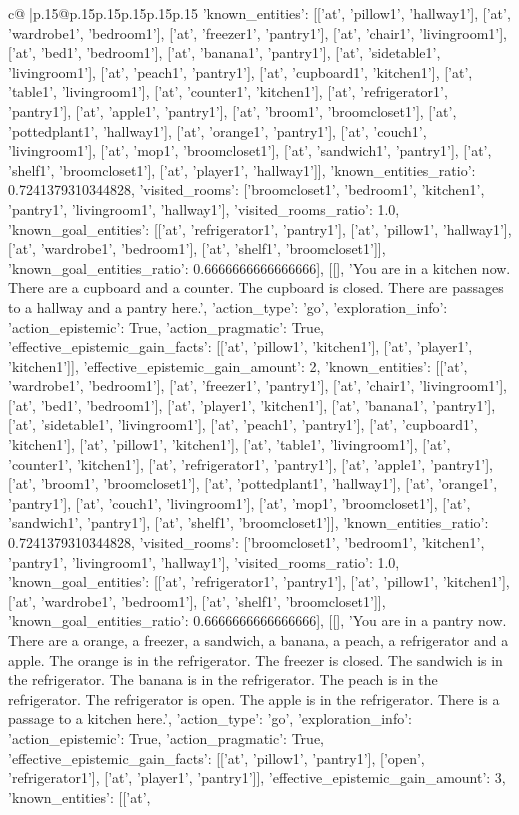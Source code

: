 \documentclass{article}
\begin{document}
{\begin{supertabular}{c@{$\;$}|p{.15\linewidth}@{}p{.15\linewidth}p{.15\linewidth}p{.15\linewidth}p{.15\linewidth}p{.15\linewidth}}
{{{'known_entities': [['at', 'pillow1', 'hallway1'], ['at', 'wardrobe1', 'bedroom1'], ['at', 'freezer1', 'pantry1'], ['at', 'chair1', 'livingroom1'], ['at', 'bed1', 'bedroom1'], ['at', 'banana1', 'pantry1'], ['at', 'sidetable1', 'livingroom1'], ['at', 'peach1', 'pantry1'], ['at', 'cupboard1', 'kitchen1'], ['at', 'table1', 'livingroom1'], ['at', 'counter1', 'kitchen1'], ['at', 'refrigerator1', 'pantry1'], ['at', 'apple1', 'pantry1'], ['at', 'broom1', 'broomcloset1'], ['at', 'pottedplant1', 'hallway1'], ['at', 'orange1', 'pantry1'], ['at', 'couch1', 'livingroom1'], ['at', 'mop1', 'broomcloset1'], ['at', 'sandwich1', 'pantry1'], ['at', 'shelf1', 'broomcloset1'], ['at', 'player1', 'hallway1']], 'known_entities_ratio': 0.7241379310344828, 'visited_rooms': ['broomcloset1', 'bedroom1', 'kitchen1', 'pantry1', 'livingroom1', 'hallway1'], 'visited_rooms_ratio': 1.0, 'known_goal_entities': [['at', 'refrigerator1', 'pantry1'], ['at', 'pillow1', 'hallway1'], ['at', 'wardrobe1', 'bedroom1'], ['at', 'shelf1', 'broomcloset1']], 'known_goal_entities_ratio': 0.6666666666666666}}], [[], 'You are in a kitchen now. There are a cupboard and a counter. The cupboard is closed. There are passages to a hallway and a pantry here.', {'action_type': 'go', 'exploration_info': {'action_epistemic': True, 'action_pragmatic': True, 'effective_epistemic_gain_facts': [['at', 'pillow1', 'kitchen1'], ['at', 'player1', 'kitchen1']], 'effective_epistemic_gain_amount': 2, 'known_entities': [['at', 'wardrobe1', 'bedroom1'], ['at', 'freezer1', 'pantry1'], ['at', 'chair1', 'livingroom1'], ['at', 'bed1', 'bedroom1'], ['at', 'player1', 'kitchen1'], ['at', 'banana1', 'pantry1'], ['at', 'sidetable1', 'livingroom1'], ['at', 'peach1', 'pantry1'], ['at', 'cupboard1', 'kitchen1'], ['at', 'pillow1', 'kitchen1'], ['at', 'table1', 'livingroom1'], ['at', 'counter1', 'kitchen1'], ['at', 'refrigerator1', 'pantry1'], ['at', 'apple1', 'pantry1'], ['at', 'broom1', 'broomcloset1'], ['at', 'pottedplant1', 'hallway1'], ['at', 'orange1', 'pantry1'], ['at', 'couch1', 'livingroom1'], ['at', 'mop1', 'broomcloset1'], ['at', 'sandwich1', 'pantry1'], ['at', 'shelf1', 'broomcloset1']], 'known_entities_ratio': 0.7241379310344828, 'visited_rooms': ['broomcloset1', 'bedroom1', 'kitchen1', 'pantry1', 'livingroom1', 'hallway1'], 'visited_rooms_ratio': 1.0, 'known_goal_entities': [['at', 'refrigerator1', 'pantry1'], ['at', 'pillow1', 'kitchen1'], ['at', 'wardrobe1', 'bedroom1'], ['at', 'shelf1', 'broomcloset1']], 'known_goal_entities_ratio': 0.6666666666666666}}], [[], 'You are in a pantry now. There are a orange, a freezer, a sandwich, a banana, a peach, a refrigerator and a apple. The orange is in the refrigerator. The freezer is closed. The sandwich is in the refrigerator. The banana is in the refrigerator. The peach is in the refrigerator. The refrigerator is open. The apple is in the refrigerator. There is a passage to a kitchen here.', {'action_type': 'go', 'exploration_info': {'action_epistemic': True, 'action_pragmatic': True, 'effective_epistemic_gain_facts': [['at', 'pillow1', 'pantry1'], ['open', 'refrigerator1'], ['at', 'player1', 'pantry1']], 'effective_epistemic_gain_amount': 3, 'known_entities': [['at', }}}
\end{supertabular}}
\end{document}
